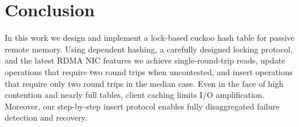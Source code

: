 \section{Conclusion}
\label{sec:conclusion}

In this work we design and implement a lock-based cuckoo hash table
for passive remote memory. Using dependent hashing, a carefully
designed locking protocol, and the latest RDMA NIC features we achieve
single-round-trip reads, update operations that require two round
trips when uncontested, and insert operations that require only two
round trips in the median case.  Even in the face of high contention
and nearly full tables, client caching limits I/O amplification.
Moreover, our step-by-step insert protocol enables fully disaggregated
failure detection and recovery.  


